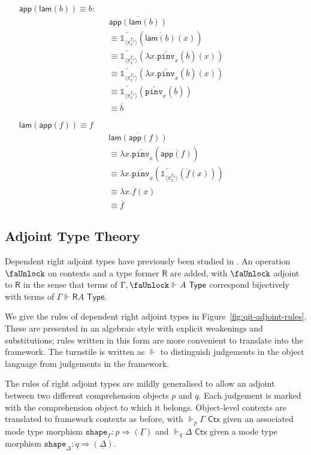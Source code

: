\documentclass[10pt]{article}
\theoremstyle{definition}
\newcommand{\tcell}{\Rightarrow}
\newcommand{\CTX}{\,\,\mathsf{Ctx}}
\newcommand{\TYPE}{\,\,\mathsf{Type}}
\newcommand{\rewrite}[2]{\overleftarrow{#1}(#2)}
\newcommand\UE[2]{\ensuremath{#1(#2)}}
\newcommand\UI[2]{\ensuremath{\lambda #1.#2}}
\newcommand\ctxtuple[1]{(#1)}
\newcommand{\modeof}[1]{{#1}_p}
\newcommand{\tshape}[1]{\ensuremath{\mathtt{shape}_{#1}}}
\newcommand{\qyields}{\Vdash}
\newcommand{\upstairs}[1]{\overline{#1}}
\newcommand{\downstairs}[1]{\underline{#1}}
\newcommand\One{\ensuremath{\mathds{1}}}
\newcommand\ApOne[1]{\ensuremath{\One_{\langle {#1} \rangle }}}
\newcommand\pinv[1]{\ensuremath{\mathtt{pinv}_{#1}}}
\newcommand\qapp[1]{\ensuremath{\mathsf{app}({#1})}}
\newcommand\qlam[1]{\ensuremath{\mathsf{lam}({#1})}}
\newcommand{\lock}{\text{\faUnlock}}
\newcommand{\Rtype}[1]{\mathsf{R}{#1}}
\begin{document}
\begin{enumerate}[style = multiline, labelwidth = 80pt]
\item[{$\qapp{\qlam{b}} \equiv b$}:] 
\begin{align*}
&\upstairs{\qapp{\qlam{b}}} \\
&\equiv \rewrite{\ApOne{\pi^{\modeof{\Gamma}}_x}}{\UE{\upstairs{\qlam{b}}}{x}} \\
&\equiv \rewrite{\ApOne{\pi^{\modeof{\Gamma}}_x}}{\UE{\UI{x}{\rewrite{\pinv{x}}{\upstairs{b}}}}{x}} \\
&\equiv \rewrite{\ApOne{\pi^{\modeof{\Gamma}}_x}}{\UE{\UI{x}{\rewrite{\pinv{x}}{\upstairs{b}}}}{x}} \\
&\equiv \rewrite{\ApOne{\pi^{\modeof{\Gamma}}_x}}{\rewrite{\pinv{x}}{\upstairs{b}}} \\
&\equiv \upstairs{b}
\end{align*}

\item[{$\qlam{\qapp{f}} \equiv f$}]
\begin{align*}
&\upstairs{\qlam{\qapp{f}}} \\
&\equiv \UI{x}{\rewrite{\pinv{x}}{\upstairs{\qapp{f}}}} \\
&\equiv \UI{x}{\rewrite{\pinv{x}}{\rewrite{\ApOne{\pi^{\modeof{\Gamma}}_x}}{\UE{\upstairs{f}}{x}}}} \\
&\equiv \UI{x}{\UE{\upstairs{f}}{x}} \\
&\equiv \upstairs{f}
\end{align*}
\end{enumerate}

\subsection{Adjoint Type Theory}

Dependent right adjoint types have previously been studied in . An operation $\lock$ on contexts and a type former $\Rtype{}$ are added, with $\lock$ adjoint to $\Rtype{}$ in the sense that terms of $\Gamma, \lock \qyields A \TYPE$ correspond bijectively with terms of $\Gamma \qyields \Rtype{A} \TYPE$.

We give the rules of dependent right adjoint types in Figure~\ref{fig:qit-adjoint-rules}. These are presented in an algebraic style with explicit weakenings and substitutions; rules written in this form are more convenient to translate into the framework. The turnstile is written as $\qyields$ to distinguish judgements in the object language from judgements in the framework.

The rules of right adjoint types are mildly generalised to allow an adjoint between two different comprehension objects $p$ and $q$. Each judgement is marked with the comprehension object to which it belongs. Object-level contexts are translated to framework contexts as before, with $\qyields_p \Gamma \CTX$ given an associated mode type morphism $\tshape{\Gamma} : p \tcell \ctxtuple{\downstairs{\Gamma}}$ and $\qyields_q \Delta \CTX$ given a mode type morphism $\tshape{\Delta} : q \tcell \ctxtuple{\downstairs{\Delta}}$.
\end{document}
